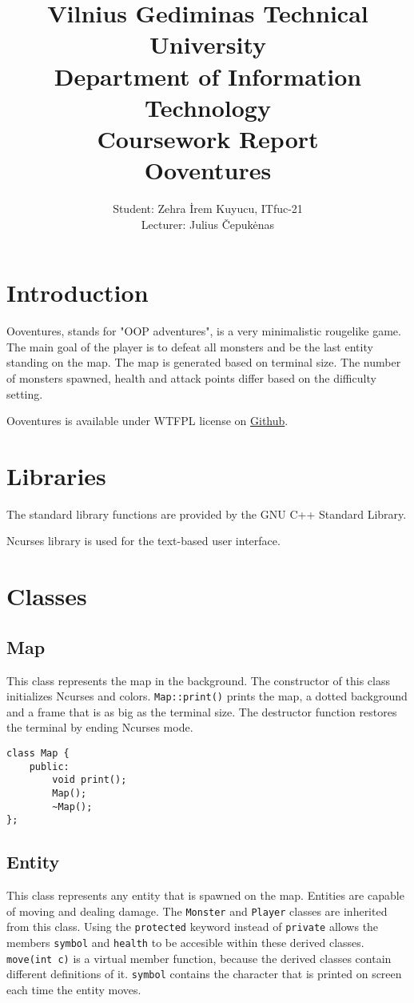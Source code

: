 \documentclass[a4paper,12pt]{article}
\author{Student: Zehra İrem Kuyucu, ITfuc-21\\Lecturer: Julius Čepukėnas}
\title{Vilnius Gediminas Technical University\\Department of Information Technology\\
\vspace{50mm}Coursework Report\\Ooventures}
\begin{document}
\maketitle

\newpage
\tableofcontents

\newpage

\section{Introduction}
Ooventures, stands for "OOP adventures", is a very minimalistic rougelike\cite{rouge} game. The main goal of the player is to defeat all monsters and be the last entity standing on the map. The map is generated based on terminal size. The number of monsters spawned, health and attack points differ based on the difficulty setting.

Ooventures is available under WTFPL license on \href{https://github.com/sausagenoods/ooventures}{Github}.

\section{Libraries}
The standard library functions are provided by the GNU C++ Standard Library.\cite{libstdcpp}

Ncurses library is used for the text-based user interface.\cite{ncurses}

\section{Classes}
\subsection{Map}
This class represents the map in the background. The constructor of this class initializes Ncurses and colors. \verb|Map::print()| prints the map, a dotted background and a frame that is as big as the terminal size. The destructor function restores the terminal by ending Ncurses mode.
\begin{lstlisting}
class Map {
	public:
		void print();
		Map();
		~Map();
};
\end{lstlisting}

\newpage

\subsection{Entity}
This class represents any entity that is spawned on the map. Entities are capable of moving and dealing damage. The \verb|Monster| and \verb|Player| classes are inherited from this class. Using the \verb|protected| keyword instead of \verb|private| allows the members \verb|symbol| and \verb|health| to be accesible within these derived classes. \verb|move(int c)| is a virtual member function, because the derived classes contain different definitions of it. \verb|symbol| contains the character that is printed on screen each time the entity moves.
\end{document}

